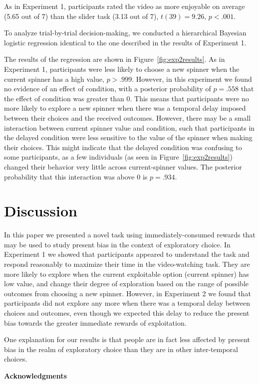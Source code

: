 \documentclass[10pt,letterpaper]{article}
\begin{document}
As in Experiment 1, participants rated the video as more enjoyable on average (5.65 out of 7) than the
slider task (3.13 out of 7), $t(39)=9.26$, $p<.001$.

To analyze trial-by-trial decision-making, we conducted a hierarchical Bayesian
logistic regression identical to the one described in the results of Experiment 1.

The results of the regression are shown in Figure~\ref{fig:exp2results}. As in Experiment 1,
participants were less likely to choose a new spinner when the current spinner
has a high value, $p>.999$. However, in this experiment we found no evidence of
an effect of condition, with a posterior probability of $p=.558$ that the effect of condition was
greater than 0. This means that participants were no more likely to explore a new spinner when there
was a temporal delay imposed between their choices and the received outcomes.
However, there may be a small interaction between current spinner value and
condition, such that participants in the delayed condition were less sensitive
to the value of the spinner when making their choices. This might indicate that
the delayed condition was confusing to some participants, as a few individuals
(as seen in Figure~\ref{fig:exp2results}) changed their behavior very little
across current-spinner values. The posterior probability that this interaction
was above 0 is $p=.934$.

\section{Discussion}

In this paper we presented a novel task using immediately-consumed rewards that
may be used to study present bias in the context of exploratory choice. In
Experiment 1 we showed that participants appeared to understand the task and
respond reasonably to maximize their time in the video-watching task. They are
more likely to explore when the current exploitable option (current spinner) has
low value, and change their degree of exploration based on the range of possible
outcomes from choosing a new spinner. However, in Experiment 2 we found that
participants did not explore any more when there was a temporal delay between
choices and outcomes, even though we expected this delay to reduce the present
bias towards the greater immediate rewards of exploitation.

One explanation for our results is that people are in fact less affected by
present bias in the realm of exploratory choice than they are in other
inter-temporal choices.

\begin{small}
  \noindent
\textbf{Acknowledgments} 
\end{small}



\end{document}
